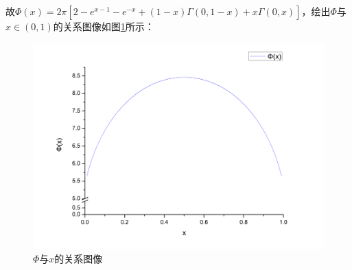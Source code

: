 \documentclass[12pt]{ctexart}
\begin{document}
故$\Phi(x) = 2 \pi [2 - e^{x-1} - e^{-x} + (1-x) \Gamma(0, 1-x) + x \Gamma(0, x)]$，绘出$\Phi$与$x \in (0, 1)$的关系图像如图\ref{fig:Phi_x}所示：
\begin{figure}[H]
    \centering
    \includegraphics[width=\textwidth]{img/phi_x1.png}
    \caption{$\Phi$与$x$的关系图像}
    \label{fig:Phi_x}
\end{figure}
\end{document}
